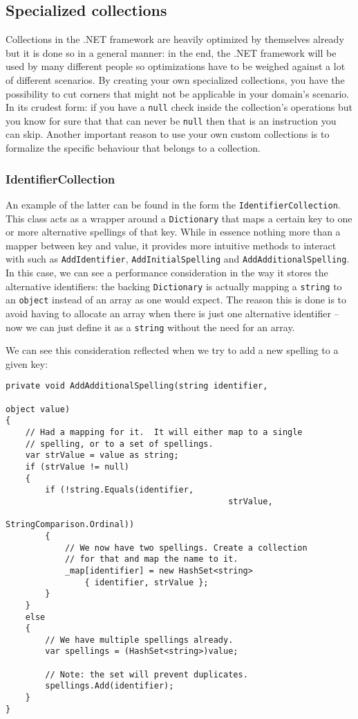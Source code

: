 \subsection{Specialized collections}
\label{sec:specialized-collections}

Collections in the .NET framework are heavily optimized by themselves already but it is done so in a general manner: in the end, the .NET framework will be used by many different people so optimizations have to be weighed against a lot of different scenarios. By creating your own specialized collections, you have the possibility to cut corners that might not be applicable in your domain's scenario. In its crudest form: if you have a \verb|null| check inside the collection's operations but you know for sure that that can never be \verb|null| then that is an instruction you can skip. Another important reason to use your own custom collections is to formalize the specific behaviour that belongs to a collection. 

\subsubsection{IdentifierCollection}
\label{sec:spec-coll-identifiercollection}

An example of the latter can be found in the form the \verb|IdentifierCollection|. This class acts as a wrapper around a \verb|Dictionary| that maps a certain key to one or more alternative spellings of that key. While in essence nothing more than a mapper between key and value, it provides more intuitive methods to interact with such as \verb|AddIdentifier|, \verb|AddInitialSpelling| and \verb|AddAdditionalSpelling|.
In this case, we can see a performance consideration in the way it stores the alternative identifiers: the backing \verb|Dictionary| is actually mapping a \verb|string| to an \verb|object| instead of an array as one would expect. The reason this is done is to avoid having to allocate an array when there is just one alternative identifier -- now we can just define it as a \verb|string| without the need for an array.

We can see this consideration reflected when we try to add a new spelling to a given key:

\begin{lstlisting}
private void AddAdditionalSpelling(string identifier, 
																	 object value)
{
	// Had a mapping for it.  It will either map to a single 
	// spelling, or to a set of spellings.
	var strValue = value as string;
	if (strValue != null)
	{
		if (!string.Equals(identifier, 
											 strValue, 
											 StringComparison.Ordinal))
		{
			// We now have two spellings. Create a collection 
			// for that and map the name to it.
			_map[identifier] = new HashSet<string> 
				{ identifier, strValue };
		}
	}
	else
	{
		// We have multiple spellings already.
		var spellings = (HashSet<string>)value;

		// Note: the set will prevent duplicates.
		spellings.Add(identifier);
	}
}
\end{lstlisting}

